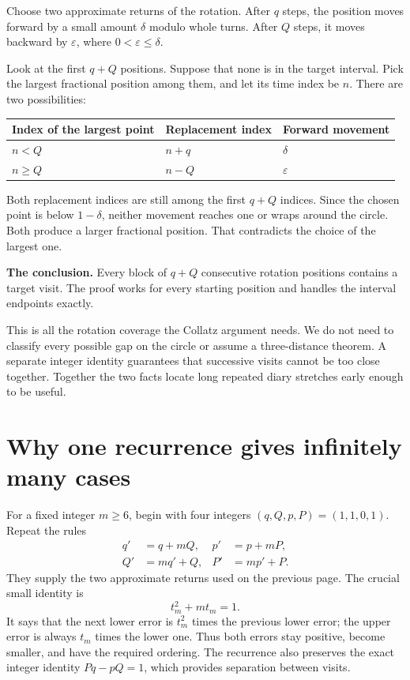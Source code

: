 \documentclass[11pt]{article}
\begin{document}
Choose two approximate returns of the rotation. After $q$ steps, the
position moves forward by a small amount $\delta$ modulo whole turns.
After $Q$ steps, it moves backward by $\varepsilon$, where
$0<\varepsilon\le\delta$.

Look at the first $q+Q$ positions. Suppose that none is in the target
interval. Pick the largest fractional position among them, and let its
time index be $n$. There are two possibilities:
\begin{center}
\begin{tabular}{lll}
\toprule
Index of the largest point&Replacement index&Forward movement\\
\midrule
$n<Q$&$n+q$&$\delta$\\
$n\ge Q$&$n-Q$&$\varepsilon$\\
\bottomrule
\end{tabular}
\end{center}
Both replacement indices are still among the first $q+Q$ indices.
Since the chosen point is below $1-\delta$, neither movement reaches one
or wraps around the circle. Both produce a larger fractional position.
That contradicts the choice of the largest one.

\begin{keyidea}
\textbf{The conclusion.} Every block of $q+Q$ consecutive rotation
positions contains a target visit. The proof works for every starting
position and handles the interval endpoints exactly.
\end{keyidea}
This is all the rotation coverage the Collatz argument needs. We do not
need to classify every possible gap on the circle or assume a
three-distance theorem. A separate integer identity guarantees that
successive visits cannot be too close together. Together the two facts
locate long repeated diary stretches early enough to be useful.

\newpage
\section{Why one recurrence gives infinitely many cases}
For a fixed integer $m\ge6$, begin with four integers
$(q,Q,p,P)=(1,1,0,1)$. Repeat the rules
\[
\begin{aligned}
q'&=q+mQ,&p'&=p+mP,\\
Q'&=mq'+Q,&P'&=mp'+P.
\end{aligned}
\]
They supply the two approximate returns used on the previous page.
The crucial small identity is
\[
t_m^2+mt_m=1.
\]
It says that the next lower error is $t_m^2$ times the previous lower
error; the upper error is always $t_m$ times the lower one. Thus both
errors stay positive, become smaller, and have the required ordering.
The recurrence also preserves the exact integer identity $Pq-pQ=1$,
which provides separation between visits.
\end{document}
